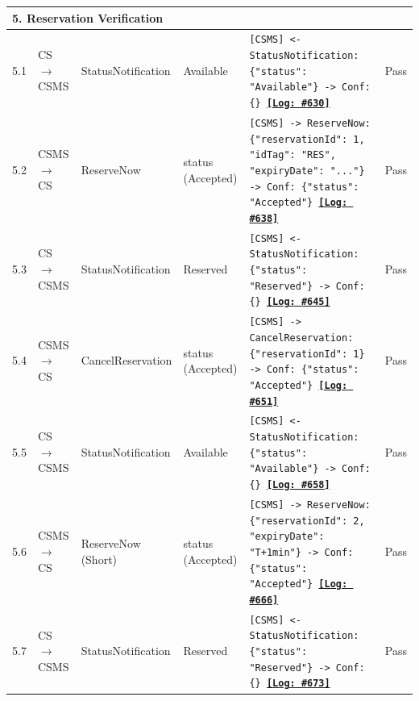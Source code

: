 \documentclass[10pt, a4paper, landscape]{article}
\begin{document}
\begin{longtable}{|p{1.0cm}|p{2.5cm}|p{4.0cm}|p{5.0cm}|p{10.0cm}|c|}
\multicolumn{6}{|l|}{\cellcolor{blue!10}\textbf{5. Reservation Verification}} \\
\hline
5.1 & CS $\to$ CSMS & StatusNotification & Available & \footnotesize\texttt{[CSMS] <- StatusNotification: \{"status": "Available"\} \newline [CSMS] -> Conf: \{\} \newline \hyperref[log:5.1]{\textbf{[Log: \#630]}}} & Pass \\
\hline
5.2 & CSMS $\to$ CS & ReserveNow & status (Accepted) & \footnotesize\texttt{[CSMS] -> ReserveNow: \{"reservationId": 1, "idTag": "RES", "expiryDate": "..."\} \newline [CS] -> Conf: \{"status": "Accepted"\} \newline \hyperref[log:5.2]{\textbf{[Log: \#638]}}} & Pass \\
\hline
5.3 & CS $\to$ CSMS & StatusNotification & Reserved & \footnotesize\texttt{[CSMS] <- StatusNotification: \{"status": "Reserved"\} \newline [CSMS] -> Conf: \{\} \newline \hyperref[log:5.3]{\textbf{[Log: \#645]}}} & Pass \\
\hline
5.4 & CSMS $\to$ CS & CancelReservation & status (Accepted) & \footnotesize\texttt{[CSMS] -> CancelReservation: \{"reservationId": 1\} \newline [CS] -> Conf: \{"status": "Accepted"\} \newline \hyperref[log:5.4]{\textbf{[Log: \#651]}}} & Pass \\
\hline
5.5 & CS $\to$ CSMS & StatusNotification & Available & \footnotesize\texttt{[CSMS] <- StatusNotification: \{"status": "Available"\} \newline [CSMS] -> Conf: \{\} \newline \hyperref[log:5.5]{\textbf{[Log: \#658]}}} & Pass \\
\hline
5.6 & CSMS $\to$ CS & ReserveNow (Short) & status (Accepted) & \footnotesize\texttt{[CSMS] -> ReserveNow: \{"reservationId": 2, "expiryDate": "T+1min"\} \newline [CS] -> Conf: \{"status": "Accepted"\} \newline \hyperref[log:5.6]{\textbf{[Log: \#666]}}} & Pass \\
\hline
5.7 & CS $\to$ CSMS & StatusNotification & Reserved & \footnotesize\texttt{[CSMS] <- StatusNotification: \{"status": "Reserved"\} \newline [CSMS] -> Conf: \{\} \newline \hyperref[log:5.7]{\textbf{[Log: \#673]}}} & Pass \\

\end{longtable}
\end{document}
